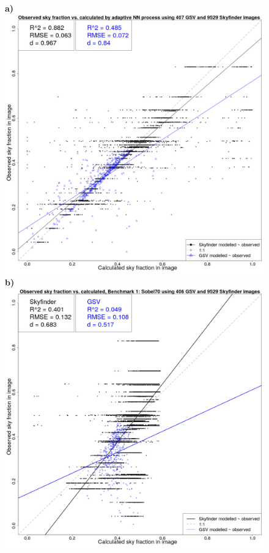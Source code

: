 \documentclass[final,3p,times,authoryear]{elsarticle}
\begin{document}
\begin{figure}
\centering
\textbf{a)}\includegraphics[scale=0.15]{Images/ErrorPlotsCNTK.png}
\textbf{b)}\includegraphics[scale=0.15]{Images/ErrorPlotsGSVandSSobel70val.png}

\end{figure}
\end{document}
